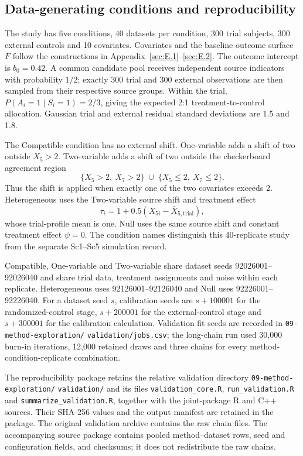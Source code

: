 \documentclass[11pt]{article}
\theoremstyle{remark}\newtheorem{remark}{Remark}[section]
\providecommand{\DIFaddtex}[1]{{\protect\color{blue} \sf #1}} %
\providecommand{\DIFadd}[1]{\texorpdfstring{\DIFaddtex{#1}}{#1}} %
\begin{document}
\subsection{\DIFadd{Data-generating conditions and reproducibility}}

\DIFadd{The study has five conditions, 40 datasets per condition, 300 trial subjects, 300 external controls and 10 covariates. Covariates and the baseline outcome surface $F$ follow the constructions in Appendix~\ref{sec:E.1}--\ref{sec:E.2}. The outcome intercept is $b_0=0.42$. A common candidate pool receives independent source indicators with probability $1/2$; exactly 300 trial and 300 external observations are then sampled from their respective source groups. Within the trial, $P(A_i=1\mid S_i=1)=2/3$, giving the expected 2:1 treatment-to-control allocation. Gaussian trial and external residual standard deviations are 1.5 and 1.8.
}

\DIFadd{The Compatible condition has no external shift. One-variable adds a shift of two outside $X_5>2$. Two-variable adds a shift of two outside the checkerboard agreement region
}\[
 \{X_5>2,\ X_7>2\}\;\cup\;\{X_5\leq 2,\ X_7\leq 2\}.
\]
\DIFadd{Thus the shift is applied when exactly one of the two covariates exceeds 2. Heterogeneous uses the Two-variable source shift and treatment effect
}\[
 \tau_i=1+0.5(X_{5i}-\bar X_{5,\mathrm{trial}}),
\]
\DIFadd{whose trial-profile mean is one. Null uses the same source shift and constant treatment effect $\psi=0$. The condition names distinguish this 40-replicate study from the separate Sc1--Sc5 simulation record.
}

\DIFadd{Compatible, One-variable and Two-variable share dataset seeds 92026001--92026040 and share trial data, treatment assignments and noise within each replicate. Heterogeneous uses 92126001--92126040 and Null uses 92226001--92226040. For a dataset seed $s$, calibration seeds are $s+100001$ for the randomized-control stage, $s+200001$ for the external-control stage and $s+300001$ for the calibration calculation. Validation fit seeds are recorded in \texttt{09-method-exploration/}}\allowbreak\DIFadd{\texttt{validation/jobs.csv}; the long-chain run used 30,000 burn-in iterations, 12,000 retained draws and three chains for every method-condition-replicate combination.
}

\DIFadd{The reproducibility package retains the relative validation directory \texttt{09-method-exploration/}}\allowbreak\DIFadd{\texttt{validation/} and its files \texttt{validation\_core.R}, \texttt{run\_validation.R} and \texttt{summarize\_validation.R}, together with the joint-package R and C++ sources. Their SHA-256 values and the output manifest are retained in the package. The original validation archive contains the raw chain files. The accompanying source package contains pooled method--dataset rows, seed and configuration fields, and checksums; it does not redistribute the raw chains.
}
\end{document}
